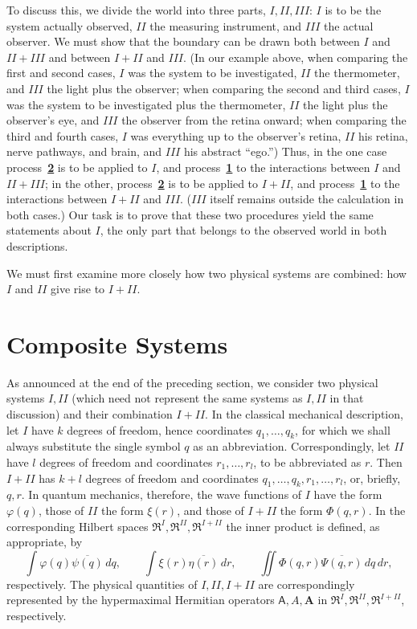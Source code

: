 \documentclass[fontsize=13pt,twoside,openany,headings=normal,parskip=false,bookmarkpackage=false,DIV=calc]{scrbook}
\begin{document}
To discuss this, we divide the world into three parts, $I,II,III$: $I$ is to be the system actually observed, $II$ the measuring instrument, and $III$ the actual observer. We must show that the boundary can be drawn both between $I$ and $II+III$ and between $I+II$ and $III$. (In our example above, when comparing the first and second cases, $I$ was the system to be investigated, $II$ the thermometer, and $III$ the light plus the observer; when comparing the second and third cases, $I$ was the system to be investigated plus the thermometer, $II$ the light plus the observer's eye, and $III$ the observer from the retina onward; when comparing the third and fourth cases, $I$ was everything up to the observer's retina, $II$ his retina, nerve pathways, and brain, and $III$ his abstract ``ego.'') Thus, in the one case process~\hyperref[eq:V.1.2]{\textbf{2}} is to be applied to $I$, and process~\hyperref[eq:V.1.1]{\textbf{1}} to the interactions between $I$ and $II+III$; in the other, process~\hyperref[eq:V.1.2]{\textbf{2}} is to be applied to $I+II$, and process~\hyperref[eq:V.1.1]{\textbf{1}} to the interactions between $I+II$ and $III$. ($III$ itself remains outside the calculation in both cases.) Our task is to prove that these two procedures yield the same statements about $I$, the only part that belongs to the observed world in both descriptions.
\hypertarget{origpage-225}{}%

We must first examine more closely how two physical systems are combined: how $I$ and $II$ give rise to $I+II$.

\section{Composite Systems}\label{sec:VI.2}
As announced at the end of the preceding section, we consider two physical systems $I,II$ (which need not represent the same systems as $I,II$ in that discussion) and their combination $I+II$. In the classical mechanical description, let $I$ have $k$ degrees of freedom, hence coordinates $q_1,\ldots,q_k$, for which we shall always substitute the single symbol $q$ as an abbreviation. Correspondingly, let $II$ have $l$ degrees of freedom and coordinates $r_1,\ldots,r_l$, to be abbreviated as $r$. Then $I+II$ has $k+l$ degrees of freedom and coordinates $q_1,\ldots,q_k,r_1,\ldots,r_l$, or, briefly, $q,r$. In quantum mechanics, therefore, the wave functions of $I$ have the form $\varphi(q)$, those of $II$ the form $\xi(r)$, and those of $I+II$ the form $\Phi(q,r)$. In the corresponding Hilbert spaces $\mathfrak R^I,\mathfrak R^{II},\mathfrak R^{I+II}$ the inner product is defined, as appropriate, by
\[
 \int\varphi(q)\overline{\psi(q)}\,dq,\qquad
 \int\xi(r)\overline{\eta(r)}\,dr,\qquad
 \iint\Phi(q,r)\overline{\Psi(q,r)}\,dq\,dr,
\]
respectively. The physical quantities of $I,II,I+II$ are correspondingly represented by the hypermaximal Hermitian operators $\mathsf A,A,\boldsymbol A$ in $\mathfrak R^I,\mathfrak R^{II},\mathfrak R^{I+II}$, respectively.
\end{document}
